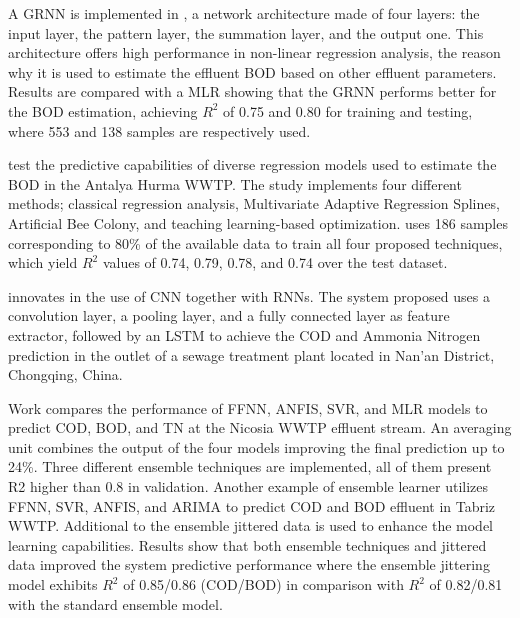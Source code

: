 A \ac{GRNN} is implemented in \cite{Heddam2016}, a network architecture made of four layers: the input layer, the pattern layer, the summation layer, and the output one. This architecture offers high performance in non-linear regression analysis, the reason why it is used to estimate the effluent \ac{BOD} based on other effluent parameters. Results are compared with a \ac{MLR} showing that the \ac{GRNN} performs better for the \ac{BOD} estimation, achieving \begin{math}R^2\end{math} of 0.75 and 0.80 for training and testing, where 553 and 138 samples are respectively used. 

\cite{Baki2019} test the predictive capabilities of diverse regression models used to estimate the \ac{BOD} in the Antalya Hurma \ac{WWTP}. The study implements four different methods; classical regression analysis, Multivariate Adaptive Regression Splines, Artificial Bee Colony, and teaching learning-based optimization. \cite{Baki2019} uses 186 samples corresponding to 80\% of the available data to train all four proposed techniques, which yield \begin{math}R^2\end{math} values of 0.74, 0.79, 0.78, and 0.74 over the test dataset.

\cite{Guo2020} innovates in the use of \ac{CNN} together with \ac{RNN}s. The system proposed uses a convolution layer, a pooling layer, and a fully connected layer as feature extractor, followed by an \ac{LSTM} to achieve the \ac{COD} and Ammonia Nitrogen prediction in the outlet of a sewage treatment plant located in Nan'an District, Chongqing, China.

Work \cite{Nourani2018} compares the performance of \ac{FFNN}, \ac{ANFIS}, \ac{SVR}, and \ac{MLR} models to predict \ac{COD}, \ac{BOD}, and \ac{TN} at the Nicosia \ac{WWTP} effluent stream. An averaging unit combines the output of the four models improving the final prediction up to 24\%. Three different ensemble techniques are implemented, all of them present R2 higher than 0.8 in validation. Another example of ensemble learner \cite{Nourani2021} utilizes \ac{FFNN}, \ac{SVR}, \ac{ANFIS}, and \ac{ARIMA} to predict \ac{COD} and \ac{BOD} effluent in Tabriz \ac{WWTP}. Additional to the ensemble jittered data is used to enhance the model learning capabilities. Results show that both ensemble techniques and jittered data improved the system predictive performance where the ensemble jittering model exhibits \begin{math}R^2\end{math} of 0.85/0.86 (\ac{COD}/\ac{BOD}) in comparison with \begin{math}R^2\end{math} of 0.82/0.81 with the standard ensemble model.

